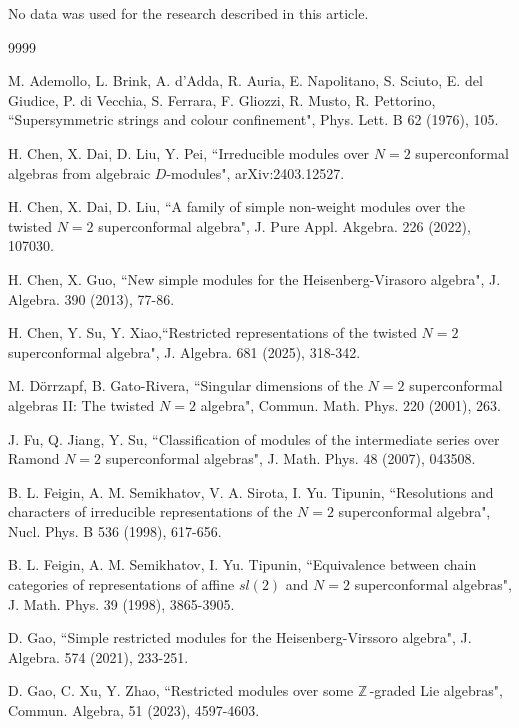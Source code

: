 \documentclass[12pt]{article}
\def\ssc{\scriptscriptstyle}
\def\Z{\mathbb{Z}{\ssc\,}}
\numberwithin{equation}{section}
\begin{document}
  No data was used for the research described in this article.
\vspace{.5cm}
\begin{thebibliography}{9999}

 M. Ademollo, L. Brink, A. d'Adda, R. Auria, E. Napolitano, S. Sciuto, E. del Giudice, P. di Vecchia, S. Ferrara,
F. Gliozzi, R. Musto, R. Pettorino,  ``Supersymmetric strings and colour confinement", Phys. Lett. B 62 (1976), 105.

 H. Chen, X. Dai, D. Liu, Y. Pei,  ``Irreducible modules over $N=2$ superconformal algebras from algebraic $D$-modules", arXiv:2403.12527.

 H. Chen, X. Dai, D. Liu,  ``A family of simple non-weight modules over the twisted $N=2$ superconformal algebra", J. Pure Appl. Akgebra. 226 (2022),  107030.

 H. Chen, X. Guo,  ``New simple modules for the Heisenberg-Virasoro algebra",
J. Algebra. 390 (2013), 77-86.



 H. Chen, Y. Su, Y. Xiao,``Restricted representations of the twisted $N=2$ superconformal algebra", J. Algebra. 681 (2025), 318-342.



 M. D\"{o}rrzapf,  B. Gato-Rivera, ``Singular dimensions of the $N=2$ superconformal algebras II: The twisted $N=2$
algebra", Commun. Math. Phys. 220 (2001), 263.

 J. Fu, Q. Jiang, Y. Su,  ``Classification of modules of the intermediate series over Ramond $N=2$ superconformal
algebras", J. Math. Phys. 48 (2007), 043508.

  B. L. Feigin, A. M. Semikhatov, V. A. Sirota, I. Yu. Tipunin,  ``Resolutions and characters of irreducible
representations of the $N=2$ superconformal algebra", Nucl. Phys. B 536 (1998), 617-656.

 B. L. Feigin, A. M. Semikhatov, I. Yu. Tipunin,   ``Equivalence between chain categories of representations of
affine $sl(2)$ and $N=2$ superconformal algebras", J. Math. Phys. 39 (1998), 3865-3905.

 D. Gao,  ``Simple restricted modules for the Heisenberg-Virssoro algebra",
J. Algebra. 574  (2021), 233-251.

 D. Gao, C. Xu, Y. Zhao,  ``Restricted modules over some $\Z$-graded Lie algebras", Commun. Algebra, 51 (2023), 4597-4603.


\end{thebibliography}
\end{document}

